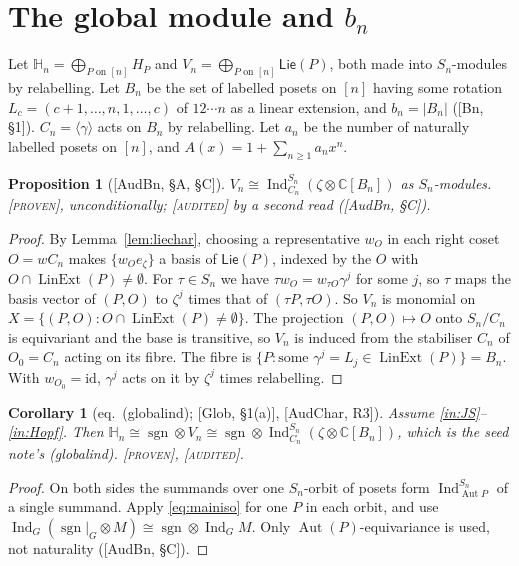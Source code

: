 \documentclass[11pt]{article}
\newtheorem{proposition}[theorem]{Proposition}
\newtheorem{corollary}[theorem]{Corollary}
\theoremstyle{definition}
\theoremstyle{remark}
\newcommand{\Lin}{\operatorname{LinExt}}
\newcommand{\Aut}{\operatorname{Aut}}
\newcommand{\sgn}{\operatorname{sgn}}
\newcommand{\Ind}{\operatorname{Ind}}
\newcommand{\HH}{\mathbb H}
\newcommand{\PLie}{\mathsf{Lie}}
\newcommand{\st}[1]{\textup{[\textsc{#1}]}}
\begin{document}
\section{The global module and $b_n$}\label{sec:global}

Let $\HH_n=\bigoplus_{P\text{ on }[n]}H_P$ and
$V_n=\bigoplus_{P\text{ on }[n]}\PLie(P)$, both made into $S_n$-modules by
relabelling. Let $B_n$ be the set of labelled posets on $[n]$ having some
rotation $L_c=(c+1,\dots,n,1,\dots,c)$ of $12\cdots n$ as a linear
extension, and $b_n=|B_n|$ ([Bn, \S1]). $C_n=\langle\gamma\rangle$ acts on
$B_n$ by relabelling. Let $a_n$ be the number of naturally labelled posets on
$[n]$, and $A(x)=1+\sum_{n\ge1}a_nx^n$.

\begin{proposition}[{[AudBn, \S A, \S C]}]\label{prop:Ind}
$V_n\cong\Ind_{C_n}^{S_n}(\zeta\otimes\mathbb C[B_n])$ as $S_n$-modules.
\st{proven}, unconditionally; \st{audited} by a second read ([AudBn, \S C]).
\end{proposition}

\begin{proof}
By Lemma~\ref{lem:liechar}, choosing a representative $w_O$ in each right
coset $O=wC_n$ makes $\{w_Oe_\zeta\}$ a basis of $\PLie(P)$, indexed by the
$O$ with $O\cap\Lin(P)\ne\emptyset$. For $\tau\in S_n$ we have
$\tau w_O=w_{\tau O}\gamma^j$ for some $j$, so $\tau$ maps the basis vector of
$(P,O)$ to $\zeta^j$ times that of $(\tau P,\tau O)$. So $V_n$ is monomial on
$X=\{(P,O):O\cap\Lin(P)\ne\emptyset\}$. The projection $(P,O)\mapsto O$ onto
$S_n/C_n$ is equivariant and the base is transitive, so $V_n$ is induced from
the stabiliser $C_n$ of $O_0=C_n$ acting on its fibre. The fibre is
$\{P:\text{some }\gamma^j=L_j\in\Lin(P)\}=B_n$. With $w_{O_0}=\mathrm{id}$,
$\gamma^j$ acts on it by $\zeta^j$ times relabelling.
\end{proof}

\begin{corollary}[eq.\ (globalind); {[Glob, \S1(a)]}, {[AudChar, R3]}]
\label{cor:globalind}
Assume \ref{in:JS}--\ref{in:Hopf}. Then
$\HH_n\cong\sgn\otimes V_n\cong\sgn\otimes\Ind_{C_n}^{S_n}(\zeta\otimes\mathbb C[B_n])$,
which is the seed note's (globalind). \st{proven}, \st{audited}.
\end{corollary}

\begin{proof}
On both sides the summands over one $S_n$-orbit of posets form
$\Ind_{\Aut P}^{S_n}$ of a single summand. Apply \eqref{eq:mainiso} for one
$P$ in each orbit, and use
$\Ind_G(\sgn|_G\otimes M)\cong\sgn\otimes\Ind_GM$. Only $\Aut(P)$-equivariance
is used, not naturality ([AudBn, \S C]).
\end{proof}
\end{document}
